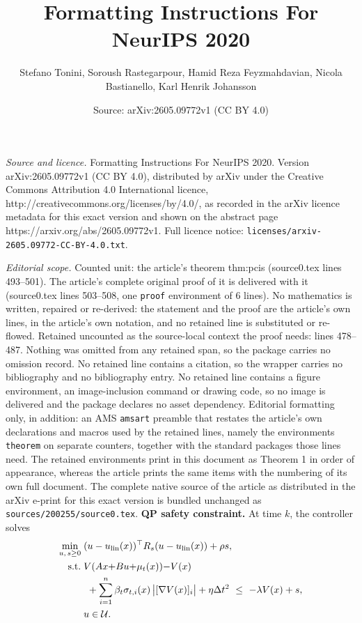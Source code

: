 \documentclass[10pt,a4paper]{amsart}
\title{Formatting Instructions For NeurIPS 2020}
\author{Stefano Tonini, Soroush Rastegarpour, Hamid Reza Feyzmahdavian, Nicola Bastianello, Karl Henrik Johansson}
\date{Source: arXiv:2605.09772v1 (CC BY 4.0)}
\newcommand{\Vdec}{\lambda}       %
\begin{document}
\maketitle

\noindent\emph{Source and licence.} Formatting Instructions For NeurIPS 2020. Version arXiv:2605.09772v1 (CC BY 4.0), distributed by arXiv under the Creative Commons Attribution 4.0 International licence, http://creativecommons.org/licenses/by/4.0/, as recorded in the arXiv licence metadata for this exact version and shown on the abstract page https://arxiv.org/abs/2605.09772v1. Full licence notice: \texttt{licenses/arxiv-2605.09772-CC-BY-4.0.txt}.\par\smallskip

\noindent\textit{Editorial scope.} Counted unit: the article's theorem thm:pcis (source0.tex lines 493--501). The article's complete original proof of it is delivered with it (source0.tex lines 503--508, one \texttt{proof} environment of 6 lines). No mathematics is written, repaired or re-derived: the statement and the proof are the article's own lines, in the article's own notation, and no retained line is substituted or re-flowed.  Retained uncounted as the source-local context the proof needs: lines 478--487.  Nothing was omitted from any retained span, so the package carries no omission record.  No retained line contains a citation, so the wrapper carries no bibliography and no bibliography entry.  No retained line contains a figure environment, an image-inclusion command or drawing code, so no image is delivered and the package declares no asset dependency.  Editorial formatting only, in addition: an AMS \texttt{amsart} preamble that restates the article's own declarations and macros used by the retained lines, namely the environments \texttt{theorem} on separate counters, together with the standard packages those lines need.  The retained environments print in this document as Theorem 1 in order of appearance, whereas the article prints the same items with the numbering of its own full document.  The complete native source of the article as distributed in the arXiv e-print for this exact version is bundled unchanged as \texttt{sources/200255/source0.tex}.
\textbf{QP safety constraint.} At time $k$, the controller solves
\begin{subequations}\label{eq:pcis_constraint}
\begin{align}
\min_{u,\,s\ge0}\;&(u-u_{\text{lin}}(x))^\top R_s (u-u_{\text{lin}}(x))+\rho s,\\
\text{s.t.}\;&V(Ax{+}Bu{+}\mu_t(x)){-}V(x)\notag\\
&\ +\sum_{i=1}^n \beta_t \sigma_{t,i}(x)\,\bigl|[\nabla V(x)]_i\bigr|
+\eta \Delta t^{2}\ \le\ -\Vdec V(x)+s,\\
&u\in\mathcal U.
\end{align}
\end{subequations}
\end{document}
